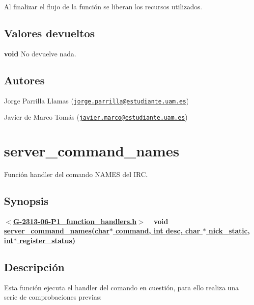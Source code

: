Al finalizar el flujo de la función se liberan los recursos utilizados.\hypertarget{server_command_part_return_part}{}\subsection{Valores devueltos}\label{server_command_part_return_part}

\begin{DoxyItemize}
\item {\bfseries void} No devuelve nada. 
\end{DoxyItemize}\hypertarget{server_command_part_authors_part}{}\subsection{Autores}\label{server_command_part_authors_part}

\begin{DoxyItemize}
\item Jorge Parrilla Llamas (\href{mailto:jorge.parrilla@estudiante.uam.es}{\tt jorge.\+parrilla@estudiante.\+uam.\+es}) 
\item Javier de Marco Tomás (\href{mailto:javier.marco@estudiante.uam.es}{\tt javier.\+marco@estudiante.\+uam.\+es}) 
\end{DoxyItemize}\hypertarget{server_command_names}{}\section{server\+\_\+command\+\_\+names}\label{server_command_names}
Función handler del comando N\+A\+M\+E\+S del I\+R\+C.\hypertarget{server_command_names_synopsis_names}{}\subsection{Synopsis}\label{server_command_names_synopsis_names}
{ {\bfseries $<$\hyperlink{G-2313-06-P1__function__handlers_8h}{G-\/2313-\/06-\/\+P1\+\_\+function\+\_\+handlers.\+h}$>$} ~\newline
 {\bfseries void \hyperlink{G-2313-06-P1__function__handlers_8c_a0fe05d80af27ae220f8fa631468606ea}{server\+\_\+command\+\_\+names(char$\ast$ command, int desc, char $\ast$ nick\+\_\+static, int$\ast$ register\+\_\+status)}} } \hypertarget{server_command_names_descripcion_names}{}\subsection{Descripción}\label{server_command_names_descripcion_names}
Esta función ejecuta el handler del comando en cuestión, para ello realiza una serie de comprobaciones previas\+:


